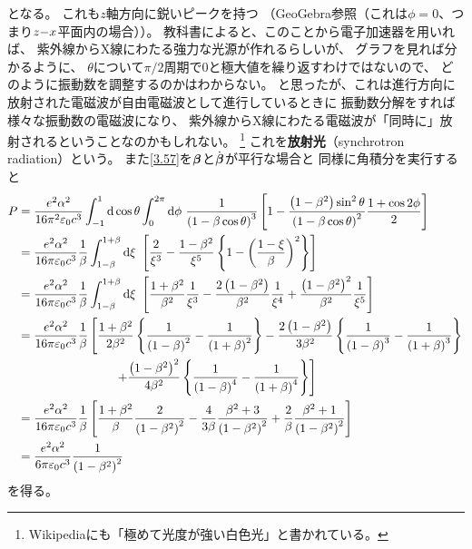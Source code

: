 \documentclass[a4paper, 10pt]{jsarticle}
\theoremstyle{definition}
\def\vec#1{\mbox{\boldmath $#1$}}
\newcommand{\ddif}{{\rm d}}
\begin{document}
となる。
これも$z$軸方向に鋭いピークを持つ
（GeoGebra参照（これは$\phi=0$、つまり$z {\rm -} x$平面内の場合））。
教科書によると、このことから電子加速器を用いれば、
紫外線からX線にわたる強力な光源が作れるらしいが、
グラフを見れば分かるように、
$\theta$について$\pi/2$周期で0と極大値を繰り返すわけではないので、
どのように振動数を調整するのかはわからない。
と思ったが、これは進行方向に放射された電磁波が自由電磁波として進行しているときに
振動数分解をすれば様々な振動数の電磁波になり、
紫外線からX線にわたる電磁波が「同時に」放射されるということなのかもしれない。
\footnote{Wikipediaにも「極めて光度が強い白色光」と書かれている。}
これを\textbf{放射光}（synchrotron radiation）という。
また\eqref{3.57}を$\vec{\beta}$と$\dot{\vec{\beta}}$が平行な場合と
同様に角積分を実行すると
\begin{align}
	P &= \frac{e^2 \alpha^2}{16 \pi^2 \varepsilon_0 c^3}
	\int_{-1}^{1} \ddif \cos \theta
	\int_{0}^{2\pi} \ddif \phi \
	\frac{1}{\left( 1 - \beta \cos \theta \right)^3} \left[
		1
		- \frac{\left( 1 - \beta^2 \right) \sin^2 \theta}
		{\left( 1 - \beta \cos \theta \right)^2}
		\frac{1 + \cos 2\phi}{2}
	\right] \\
	&= \frac{e^2 \alpha^2}{16 \pi \varepsilon_0 c^3}
	\frac{1}{\beta} \int_{1-\beta}^{1+\beta} \ddif \xi \ \left[
		\frac{2}{\xi^3}
		- \frac{1 - \beta^2}{\xi^5} \left\{
			1 - \left( \frac{1 - \xi}{\beta} \right)^2
		\right\}
	\right] \\
	&= \frac{e^2 \alpha^2}{16 \pi \varepsilon_0 c^3}
	\frac{1}{\beta} \int_{1-\beta}^{1+\beta} \ddif \xi \ \left[
		\frac{1 + \beta^2}{\beta^2} \frac{1}{\xi^3}
		- \frac{2 \left( 1 - \beta^2 \right)}{\beta^2} \frac{1}{\xi^4}
		+ \frac{\left( 1 - \beta^2 \right)^2}{\beta^2} \frac{1}{\xi^5}
	\right] \\
	&= \frac{e^2 \alpha^2}{16 \pi \varepsilon_0 c^3} \frac{1}{\beta} \left[
		\frac{1 + \beta^2}{2\beta^2} \left\{
			\frac{1}{\left( 1 - \beta \right)^2}
			- \frac{1}{\left( 1 + \beta \right)^2}
		\right\}
		- \frac{2 \left( 1 - \beta^2 \right)}{3\beta^2} \left\{
			\frac{1}{\left( 1 - \beta \right)^3}
			- \frac{1}{\left( 1 + \beta \right)^3}
		\right\} \right. \\
		& \qquad \qquad \qquad \qquad \left.
		+ \frac{\left( 1 - \beta^2 \right)^2}{4 \beta^2} \left\{
			\frac{1}{\left( 1 - \beta \right)^4}
			- \frac{1}{\left( 1 + \beta \right)^4}
		\right\}
	\right] \\
	&= \frac{e^2 \alpha^2}{16 \pi \varepsilon_0 c^3} \frac{1}{\beta} \left[
		\frac{1 + \beta^2}{\beta}
		\frac{2}{\left( 1 - \beta^2 \right)^2}
		- \frac{4}{3 \beta}
		\frac{\beta^2 + 3}{\left( 1 - \beta^2 \right)^2}
		+ \frac{2}{\beta}
		\frac{\beta^2 + 1}{\left( 1 - \beta^2 \right)^2}
	\right] \\
	&= \frac{e^2 \alpha^2}{6 \pi \varepsilon_0 c^3}
	\frac{1}{\left( 1 - \beta^2 \right)^2}
\end{align}
を得る。
\end{document}
